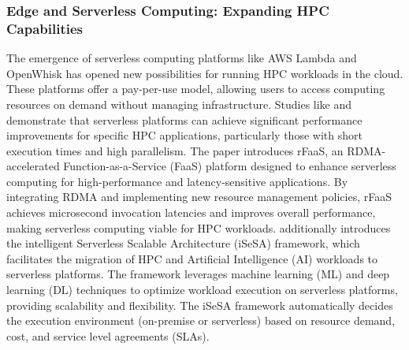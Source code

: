    \subsubsection{Edge and Serverless Computing: Expanding HPC Capabilities}
    \label{subsec:edge_computing}
    The emergence of serverless computing platforms like AWS Lambda and OpenWhisk has opened new possibilities for running HPC workloads in the cloud. These platforms offer a pay-per-use model, allowing users to access computing resources on demand without managing infrastructure. Studies like \cite{chahal_isesa_2022} and \cite{copik_rfaas_2023} demonstrate that serverless platforms can achieve significant performance improvements for specific HPC applications, particularly those with short execution times and high parallelism. The paper introduces rFaaS, an RDMA-accelerated Function-as-a-Service (FaaS) platform designed to enhance serverless computing for high-performance and latency-sensitive applications. By integrating RDMA and implementing new resource management policies, rFaaS achieves microsecond invocation latencies and improves overall performance, making serverless computing viable for HPC workloads. \cite{chahal_isesa_2022} additionally introduces the intelligent Serverless Scalable Architecture (iSeSA) framework, which facilitates the migration of HPC and Artificial Intelligence (AI) workloads to serverless platforms. The framework leverages machine learning (ML) and deep learning (DL) techniques to optimize workload execution on serverless platforms, providing scalability and flexibility. The iSeSA framework automatically decides the execution environment (on-premise or serverless) based on resource demand, cost, and service level agreements (SLAs).

